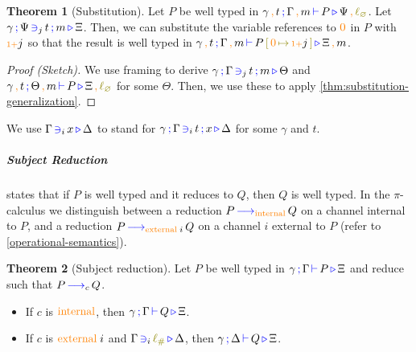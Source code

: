 \documentclass[sigplan,10pt,anonymous,review]{acmart}
\theoremstyle{definition}
\newtheorem{nitheorem}{Theorem}
\newcommand{\picalc}{$\pi$-calculus}
\newcommand{\type}[1]{\textcolor{blue}{\operatorname{#1}}}
\newcommand{\constr}[1]{\textcolor{orange}{\operatorname{#1}}}
\newcommand{\func}[1]{\textcolor{olive}{\operatorname{#1}}}
\newcommand{\suc}{\constr{\scriptstyle 1+}}
\newcommand{\comma}{\, \constr{,} \,}
\newcommand{\subst}[3]{#1 \, \func{[} \, #3 \, \func{\mapsto} \,#2 \, \func{]}}
\newcommand{\lz}{\func{\ell_{\varnothing}}}
\newcommand{\lio}{\func{\ell_{\#}}}
\newcommand{\reduce}[1]{\, \type{\longrightarrow}_{#1} \,}
\newcommand{\types}[4]{#1 \, \type{;} \, #2 \, \type{\vdash} \, #3 \, \type{\triangleright} \, #4}
\newcommand{\contains}[6]{#1 \, \type{;} \, #2 \, \type{\ni}_{#3} \, #4 \, \type{;} \, #5 \, \type{\triangleright} \, #6}
\newcommand{\containsusage}[4]{#1 \, \type{\ni}_{#2} \, #3 \, \type{\triangleright} \, #4}
\begin{document}
\begin{nitheorem}[Substitution]
  \label{thm:substitution}
  Let $P$ be well typed in $\types{\gamma \comma t}{\Gamma \comma m}{P}{\Psi \comma \lz}$.
  Let $\contains{\gamma}{\Psi}{j}{t}{m}{\Xi}$.
  Then, we can substitute the variable references to $\constr{0}$ in $P$ with $\suc j$ so that the result is well typed in $\types{\gamma \comma t}{\Gamma \comma m}{\subst{P}{\suc j}{\constr{0}}}{\Xi \comma m}$.
\end{nitheorem}
\begin{proof}[Proof (Sketch)]
  We use framing to derive $\contains{\gamma}{\Gamma}{j}{t}{m}{\Theta}$ and $\types{\gamma \comma t}{\Theta \comma m}{P}{\Xi \comma \lz}$ for some $\Theta$.
  Then, we use these to apply \autoref{thm:substitution-generalization}.
\end{proof}


  We use $\containsusage{\Gamma}{i}{x}{\Delta}$ to stand for $\contains{\gamma}{\Gamma}{i}{t}{x}{\Delta}$ for some $\gamma$ and $t$.

\subparagraph*{Subject Reduction}
states that if $P$ is well typed and it reduces to $Q$, then $Q$ is well typed.
In the \picalc{} we distinguish between a reduction $P \reduce{\constr{internal}} Q$ on a channel internal to $P$, and a reduction $P \reduce{\constr{external} \; i} Q$ on a channel $i$ external to $P$ (refer to \autoref{operational-semantics}).

\begin{nitheorem}[Subject reduction]
  \label{thm:subject-reduction}
  Let $P$ be well typed in $\types{\gamma}{\Gamma}{P}{\Xi}$ and reduce such that $P \reduce{c} Q$.
  \begin{itemize}
    \item If $c$ is $\constr{internal}$, then $\types{\gamma}{\Gamma}{Q}{\Xi}$.
    \item If $c$ is $\constr{external} \; i$ and $\containsusage{\Gamma}{i}{\lio}{\Delta}$, then $\types{\gamma}{\Delta}{Q}{\Xi}$.
  \end{itemize}
\end{nitheorem}
\end{document}
